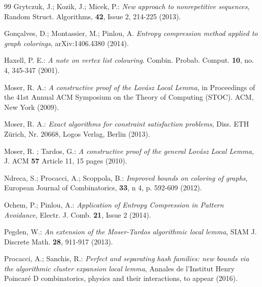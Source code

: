 \documentclass[11pt]{article}
\begin{document}
\begin{thebibliography}{99}
 Grytczuk, J.; Kozik, J.; Micek, P.: {\it New approach to nonrepetitive sequences},
Random Struct. Algorithms, {\bf 42}, Issue 2, 214-225 (2013).

 Gon\c{c}alves, D.; Montassier, M.; Pinlou, A. {\it Entropy compression
method applied to graph colorings}, arXiv:1406.4380 (2014).




 Haxell, P. E.: {\it  A note on vertex list colouring}. Combin. Probab. Comput. {\bf 10}, no. 4, 345-347 (2001).



 Moser, R. A.: {\it A constructive proof of the Lov\'asz Local Lemma}, in Proceedings of the 41st Annual
ACM Symposium on the Theory of Computing (STOC). ACM, New York (2009).

 Moser, R. A.: {\it Exact algorithms for constraint satisfaction problems},
Diss. ETH Z\"urich, Nr. 20668, Logos Verlag, Berlin (2013).

 { Moser, R. ; Tardos, G.: {\it A constructive proof of the general Lov\'asz Local
Lemma}, J. ACM {\bf 57} Article 11, 15 pages  (2010).}

 Ndreca, S.;  Procacci, A.; Scoppola, B.: {\it
Improved bounds on coloring of graphs},  European Journal of
Combinatorics, {\bf 33}, n 4, p. 592-609 (2012).


 Ochem, P.; Pinlou, A.: {\it Application of Entropy Compression in Pattern Avoidance},
Electr.  J. Comb. {\bf  21}, Issue 2 (2014).

 Pegden, W.: {\it An extension of the Moser-Tardos algorithmic local lemma},
SIAM J. Discrete Math. {\bf 28}, 911-917 (2013).

 Procacci, A.; Sanchis, R.: {\it Perfect and separating hash families:
new bounds via the algorithmic cluster expansion local lemma},
Annales  de l'Institut Henry Poincar\'e D  combinatorics,
physics and their interactions, to appear (2016).


\end{thebibliography}
\end{document}

